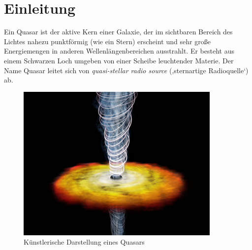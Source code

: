 
\chapter{Einleitung}

Ein Quasar ist der aktive Kern einer Galaxie, der im sichtbaren Bereich des Lichtes nahezu punktförmig (wie ein Stern) erscheint und sehr große Energiemengen in anderen Wellenlängenbereichen ausstrahlt. Er besteht aus einem Schwarzen Loch umgeben von einer Scheibe leuchtender Materie. Der Name Quasar leitet sich von \textit{quasi-stellar radio source} (‚sternartige Radioquelle‘) ab.

\begin{figure}[h]
	\centering
	\includegraphics[width=10cm]{Imgs/quasar_illustration}
	\caption{Künstlerische Darstellung eines Quasars\cite{wikiQuasar1}}
	\label{fig:darstQuasar}
\end{figure}